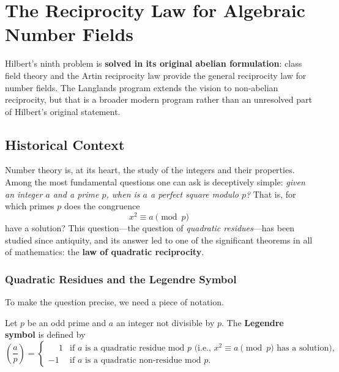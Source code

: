 
\chapter{The Reciprocity Law for Algebraic Number Fields}

\begin{solvedbox}
Hilbert's ninth problem is \textbf{solved in its original abelian formulation}: class field theory and the Artin reciprocity law provide the general reciprocity law for number fields. The Langlands program extends the vision to non-abelian reciprocity, but that is a broader modern program rather than an unresolved part of Hilbert's original statement.
\end{solvedbox}

\section{Historical Context}

Number theory is, at its heart, the study of the integers and their properties. Among the most fundamental questions one can ask is deceptively simple: \emph{given an integer $a$ and a prime $p$, when is $a$ a perfect square modulo $p$?} That is, for which primes $p$ does the congruence
\[
    x^2 \equiv a \pmod{p}
\]
have a solution? This question---the question of \emph{quadratic residues}---has been studied since antiquity, and its answer led to one of the significant theorems in all of mathematics: the \textbf{law of quadratic reciprocity}.

\subsection{Quadratic Residues and the Legendre Symbol}

To make the question precise, we need a piece of notation.

\begin{definition}
Let $p$ be an odd prime and $a$ an integer not divisible by $p$. The \textbf{Legendre symbol} is defined by
\[
    \left(\frac{a}{p}\right) = \begin{cases} \phantom{-}1 & \text{if $a$ is a quadratic residue mod $p$ (i.e., $x^2 \equiv a \pmod{p}$ has a solution),} \\ -1 & \text{if $a$ is a quadratic non-residue mod $p$.} \end{cases}
\]
\end{definition}

